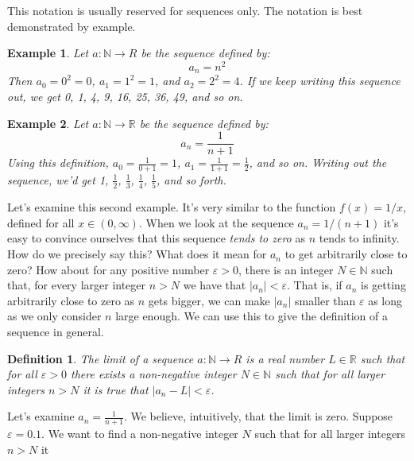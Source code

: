 \documentclass{article}
\theoremstyle{normal}
\newtheorem{definition}{Definition}
\newtheorem{example}{Example}
\theoremstyle{plain}
\begin{document}
    This notation is usually reserved for sequences only. The notation is best
    demonstrated by example.
    \begin{example}
        Let $a:\mathbb{N}\rightarrow{R}$ be the sequence defined by:
        \begin{equation}
            a_{n}=n^{2}
        \end{equation}
        Then $a_{0}=0^{2}=0$, $a_{1}=1^{2}=1$, and $a_{2}=2^{2}=4$. If we keep
        writing this sequence out, we get 0, 1, 4, 9, 16, 25, 36, 49, and so on.
    \end{example}
    \begin{example}
        Let $a:\mathbb{N}\rightarrow\mathbb{R}$ be the sequence defined by:
        \begin{equation}
            a_{n}=\frac{1}{n+1}
        \end{equation}
        Using this definition, $a_{0}=\frac{1}{0+1}=1$,
        $a_{1}=\frac{1}{1+1}=\frac{1}{2}$, and so on. Writing out the sequence,
        we'd get 1, $\frac{1}{2}$, $\frac{1}{3}$, $\frac{1}{4}$,
        $\frac{1}{5}$, and so forth.
    \end{example}
    Let's examine this second example. It's very similar to the function
    $f(x)=1/x$, defined for all $x\in(0,\infty)$. When we look at the sequence
    $a_{n}=1/(n+1)$ it's easy to convince ourselves that this sequence
    \textit{tends to zero} as $n$ tends to infinity. How do we precisely say
    this? What does it mean for $a_{n}$ to get arbitrarily close to zero?
    How about for any positive number $\varepsilon>0$, there is an integer
    $N\in\mathbb{N}$ such that, for every larger integer $n>N$ we have that
    $|a_{n}|<\varepsilon$. That is, if $a_{n}$ is getting arbitrarily close to
    zero as $n$ gets bigger, we can make $|a_{n}|$ smaller than $\varepsilon$
    as long as we only consider $n$ large enough. We can use this to give the
    definition of a sequence in general.
    \begin{definition}
        The limit of a sequence $a:\mathbb{N}\rightarrow{R}$ is a real number
        $L\in\mathbb{R}$ such that for all $\varepsilon>0$ there exists a
        non-negative integer $N\in\mathbb{N}$ such that for all larger integers
        $n>N$ it is true that $|a_{n}-L|<\varepsilon$.
    \end{definition}
    Let's examine $a_{n}=\frac{1}{n+1}$. We believe, intuitively, that the
    limit is zero. Suppose $\varepsilon=0.1$. We want to
    find a non-negative integer $N$ such that for all larger integers $n>N$ it
\end{document}
